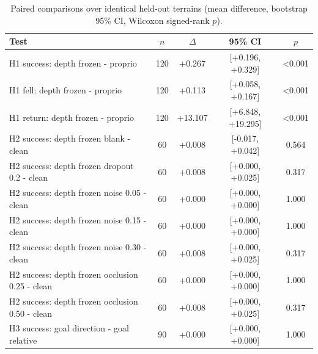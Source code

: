 \begin{table}[t]
\centering\caption{Paired comparisons over identical held-out terrains (mean difference, bootstrap 95\% CI, Wilcoxon signed-rank $p$).}\label{tab:tests}
\scriptsize\begin{tabular}{lcccc}\toprule
Test & $n$ & $\Delta$ & 95\% CI & $p$\\\midrule
H1 success: depth frozen - proprio & 120 & +0.267 & [+0.196, +0.329] & <0.001 \\
H1 fell: depth frozen - proprio & 120 & +0.113 & [+0.058, +0.167] & <0.001 \\
H1 return: depth frozen - proprio & 120 & +13.107 & [+6.848, +19.295] & <0.001 \\
H2 success: depth frozen blank - clean & 60 & +0.008 & [-0.017, +0.042] & 0.564 \\
H2 success: depth frozen dropout 0.2 - clean & 60 & +0.008 & [+0.000, +0.025] & 0.317 \\
H2 success: depth frozen noise 0.05 - clean & 60 & +0.000 & [+0.000, +0.000] & 1.000 \\
H2 success: depth frozen noise 0.15 - clean & 60 & +0.000 & [+0.000, +0.000] & 1.000 \\
H2 success: depth frozen noise 0.30 - clean & 60 & +0.008 & [+0.000, +0.025] & 0.317 \\
H2 success: depth frozen occlusion 0.25 - clean & 60 & +0.000 & [+0.000, +0.000] & 1.000 \\
H2 success: depth frozen occlusion 0.50 - clean & 60 & +0.008 & [+0.000, +0.025] & 0.317 \\
H3 success: goal direction - goal relative & 90 & +0.000 & [+0.000, +0.000] & 1.000 \\
\bottomrule\end{tabular}\end{table}
